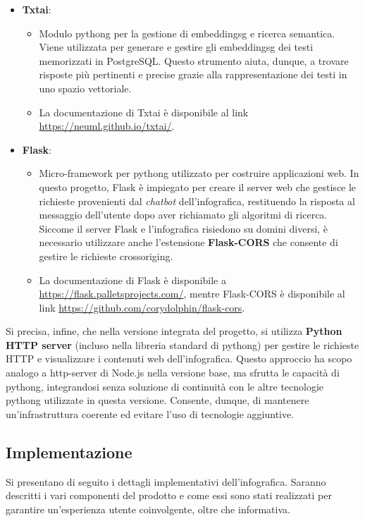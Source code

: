 \begin{itemize}
    \item \textbf{Txtai}:
    \begin{itemize}
        \item Modulo \gls{pythong} per la gestione di \gls{embeddingsg} e ricerca semantica. Viene utilizzata per generare e gestire gli \gls{embeddingsg} dei testi memorizzati in PostgreSQL. 
        Questo strumento aiuta, dunque, a trovare risposte più pertinenti e precise grazie alla rappresentazione dei testi in uno spazio vettoriale.
        \item La documentazione di Txtai è disponibile al link \href{https://neuml.github.io/txtai/}{https://neuml.github.io/txtai/}.
    \end{itemize}

    \item \textbf{Flask}:
    \begin{itemize}
        \item Micro-framework per \gls{pythong} utilizzato per costruire applicazioni web. In questo progetto, Flask è impiegato per creare il server web che gestisce le richieste 
        provenienti dal \emph{chatbot} dell'infografica, restituendo la risposta al messaggio dell'utente dopo aver richiamato gli algoritmi di ricerca. 
        Siccome il server Flask e l'infografica risiedono su domini diversi, è necessario utilizzare anche l'estensione \textbf{Flask-CORS} che consente di gestire le richieste \gls{crossoriging}.
        \item La documentazione di Flask è disponibile a \href{https://flask.palletsprojects.com/}{https://flask.palletsprojects.com/}, mentre Flask-CORS è disponibile al link 
        \href{https://github.com/corydolphin/flask-cors}{https://github.com/corydolphin/flask-cors}.
    \end{itemize}
\end{itemize}
Si precisa, infine, che nella versione integrata del progetto, si utilizza \textbf{Python HTTP server} (incluso nella libreria standard di \gls{pythong}) per gestire le richieste HTTP e visualizzare i contenuti web dell'infografica. 
Questo approccio ha scopo analogo a http-server di Node.js nella versione base, ma sfrutta le capacità di \gls{pythong}, integrandosi senza soluzione di continuità con le altre tecnologie \gls{pythong} utilizzate in questa versione. 
Consente, dunque, di mantenere un'infrastruttura coerente ed evitare l'uso di tecnologie aggiuntive.


\subsection{Implementazione}
Si presentano di seguito i dettagli implementativi dell'infografica. Saranno descritti i vari componenti del prodotto e come essi sono stati realizzati per garantire un'esperienza utente coinvolgente, oltre che informativa.

